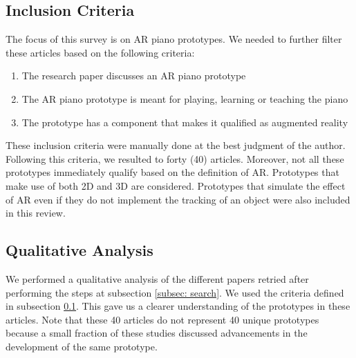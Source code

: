 \documentclass[manuscript,screen]{acmart}
\begin{document}
\subsection{Inclusion Criteria}
\label{subsec: criteria}
The focus of this survey is on AR piano prototypes. We needed to further filter these articles based on the following criteria:
\begin{enumerate}
    \item The research paper discusses an AR piano prototype 
    \item The AR piano prototype is meant for playing, learning or teaching the piano
    \item The prototype has a component that makes it qualified as augmented reality
\end{enumerate}
These inclusion criteria were manually done at the best judgment of the author. Following this criteria, we resulted to forty (40) articles. Moreover, not all these prototypes immediately qualify based on the definition of AR. Prototypes that make use of both 2D and 3D are considered. Prototypes that simulate the effect of AR even if they do not implement the tracking of an object were also included in this review. 

\subsection{Qualitative Analysis}
We performed a qualitative analysis of the different papers retried after performing the steps at subsection \ref{subsec: search}. We used the criteria defined in subsection \ref{subsec: criteria}. This gave us a clearer understanding of the prototypes in these articles. Note that these 40 articles do not represent 40 unique prototypes because a small fraction of these studies discussed advancements in the development of the same prototype.
\end{document}
